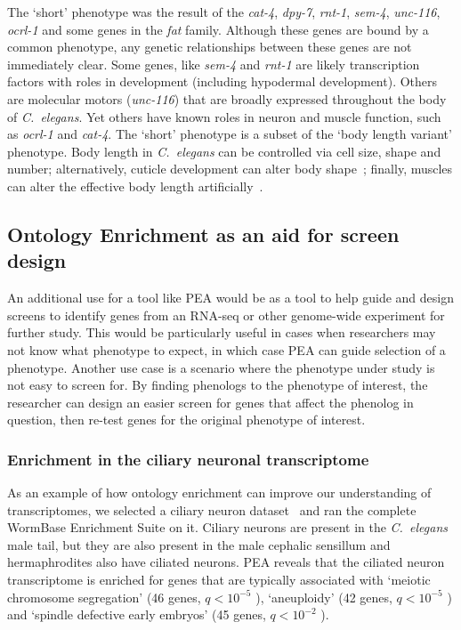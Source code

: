 \documentclass[10pt,letterpaper,twocolumn]{article}
\newcommand{\cel}{\emph{C.~elegans}}
\newcommand{\qval}[1]{
                      \ensuremath{
                                  q<10^{-#1}
                                  }
                      }
\begin{document}
The `short' phenotype was the result of the \emph{cat-4}, \emph{dpy-7},
\emph{rnt-1}, \emph{sem-4}, \emph{unc-116}, \emph{ocrl-1} and some genes in the
\emph{fat} family. Although these genes are bound by a common phenotype, any
genetic relationships between these genes are not immediately clear. Some genes,
like \emph{sem-4} and \emph{rnt-1} are likely transcription factors with roles
in development (including hypodermal development).
Others are molecular motors (\emph{unc-116}) that are broadly expressed throughout
the body of \cel{}. Yet others have known roles in neuron and muscle function,
such as \emph{ocrl-1} and \emph{cat-4}. The `short' phenotype is a subset of
the `body length variant' phenotype. Body length in \cel{} can be controlled via
cell size, shape and number\cite{}; alternatively, cuticle development can alter body
shape~\cite{}; finally, muscles can alter the effective body length artificially~\cite{}.

\subsection*{Ontology Enrichment as an aid for screen design}
An additional use for a tool like PEA would be as a tool to help guide and
design screens to identify genes from an RNA-seq or other genome-wide experiment
for further study. This would be particularly useful in cases when researchers
may not know what phenotype to expect, in which case PEA can guide selection of
a phenotype. Another use case is a scenario where the phenotype under study is
not easy to screen for. By finding phenologs to the phenotype of interest, the
researcher can design an easier screen for genes that affect the phenolog in
question, then re-test genes for the original phenotype of interest.

\subsubsection*{Enrichment in the ciliary neuronal transcriptome}
As an example of how ontology enrichment can improve our understanding of
transcriptomes,
we selected a ciliary neuron dataset~\cite{} and ran the complete WormBase
Enrichment Suite on it. Ciliary neurons are present in the \cel{} male tail, but
they are also present in the male cephalic sensillum and hermaphrodites also have
ciliated neurons. PEA reveals that the ciliated
neuron transcriptome is enriched for genes that are typically associated with
`meiotic chromosome segregation' (46 genes, \qval{5}),
`aneuploidy' (42 genes, \qval{5}) and `spindle defective early embryos' (45
genes, \qval{2}).
\end{document}
